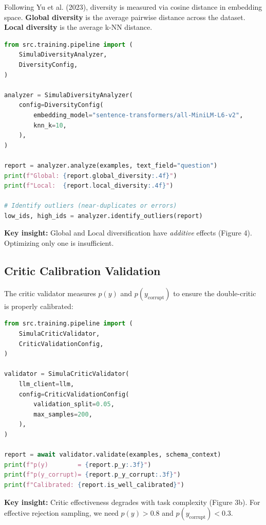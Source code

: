 \documentclass[11pt,a4paper]{article}
\begin{document}
Following Yu et al. (2023), diversity is measured via cosine distance in embedding
space. \textbf{Global diversity} is the average pairwise distance across the dataset.
\textbf{Local diversity} is the average k-NN distance.

\begin{lstlisting}[language=Python,caption={Diversity analyzer usage}]
from src.training.pipeline import (
    SimulaDiversityAnalyzer,
    DiversityConfig,
)

analyzer = SimulaDiversityAnalyzer(
    config=DiversityConfig(
        embedding_model="sentence-transformers/all-MiniLM-L6-v2",
        knn_k=10,
    ),
)

report = analyzer.analyze(examples, text_field="question")
print(f"Global: {report.global_diversity:.4f}")
print(f"Local:  {report.local_diversity:.4f}")

# Identify outliers (near-duplicates or errors)
low_ids, high_ids = analyzer.identify_outliers(report)
\end{lstlisting}

\textbf{Key insight:} Global and Local diversification have \emph{additive} effects
(Figure 4). Optimizing only one is insufficient.

\subsection{Critic Calibration Validation}

The critic validator measures $p(y)$ and $p(y_{\text{corrupt}})$ to ensure the
double-critic is properly calibrated:

\begin{lstlisting}[language=Python,caption={Critic validator usage}]
from src.training.pipeline import (
    SimulaCriticValidator,
    CriticValidationConfig,
)

validator = SimulaCriticValidator(
    llm_client=llm,
    config=CriticValidationConfig(
        validation_split=0.05,
        max_samples=200,
    ),
)

report = await validator.validate(examples, schema_context)
print(f"p(y)        = {report.p_y:.3f}")
print(f"p(y_corrupt)= {report.p_y_corrupt:.3f}")
print(f"Calibrated: {report.is_well_calibrated}")
\end{lstlisting}

\textbf{Key insight:} Critic effectiveness degrades with task complexity (Figure 3b).
For effective rejection sampling, we need $p(y) > 0.8$ and $p(y_{\text{corrupt}}) < 0.3$.
\end{document}
